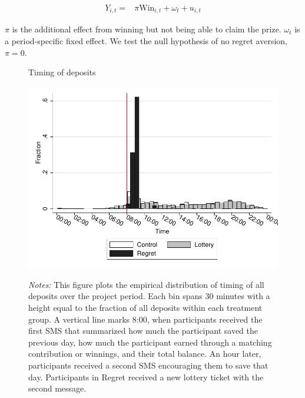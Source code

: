 \documentclass[11pt]{article}
\begin{document}
		\begin{equation} \begin{split}
		Y_{i,t} = & \pi \text{Win}_{i,t} + \omega_{t} + u_{i,t}
		\end{split} \label{eq:regret} \end{equation}

		$\pi$ is the additional effect from winning but not being able to claim the prize. $\omega_{t}$ is a period-specific fixed effect. We test the null hypothesis of no regret aversion, $\pi = 0$.


		\begin{figure}[ht]
		\centering
		\caption{Timing of deposits}
		\includegraphics[width=\textwidth]{../../figures/hist-deposits.pdf}
		\label{fig:hist-deposits}
		\caption*{\footnotesize \emph{Notes:} This figure plots the empirical distribution of timing of all deposits over the project period. Each bin spans 30 minutes with a height equal to the fraction of all deposits within each treatment group. A vertical line marks 8:00, when participants received the first SMS that summarized how much the participant saved the previous day, how much the participant earned through a matching contribution or winnings, and their total balance. An hour later, participants received a second SMS encouraging them to save that day. Participants in Regret received a new lottery ticket with the second message.}
		\end{figure}
\end{document}
